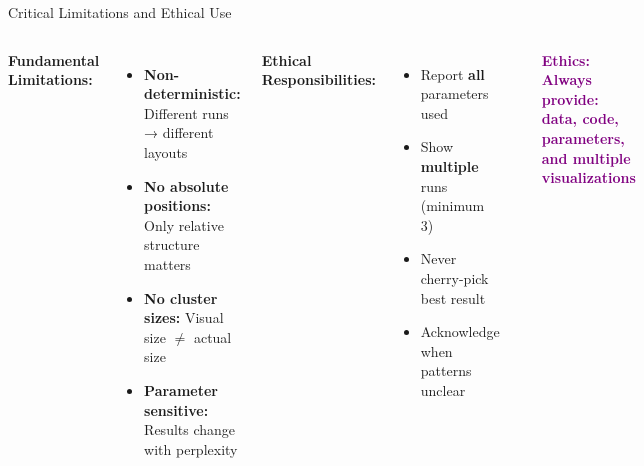 \documentclass[aspectratio=169]{beamer}
\newcommand{\conceptbox}[2]{\colorbox{#1!20}{\textcolor{#1}{\textbf{#2}}}}
\newcommand{\ethics}[1]{\conceptbox{purple}{Ethics: #1}}
\begin{document}

\begin{frame}{Critical Limitations and Ethical Use}
\begin{columns}
\textbf{Fundamental Limitations:}
\begin{itemize}
\item \textbf{Non-deterministic:} Different runs → different layouts
\item \textbf{No absolute positions:} Only relative structure matters
\item \textbf{No cluster sizes:} Visual size $\neq$ actual size
\item \textbf{Parameter sensitive:} Results change with perplexity
\end{itemize}

\textbf{Ethical Responsibilities:}
\begin{itemize}
\item Report \textbf{all} parameters used
\item Show \textbf{multiple} runs (minimum 3)
\item Never cherry-pick best result
\item Acknowledge when patterns unclear
\end{itemize}

\begin{center}
\end{center}

\vspace{0.3cm}
\ethics{Always provide: data, code, parameters, and multiple visualizations}
\end{columns}
\end{frame}
\end{document}
